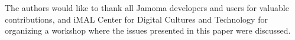 \documentclass{NIME-alternate}
\begin{document}
The authors would like to thank all Jamoma developers and users for valuable contributions, and iMAL Center for Digital Cultures and Technology for organizing a workshop where the issues presented in this paper were discussed.





%
\begin{small}

\end{small}
%


\balancecolumns %
\end{document}
